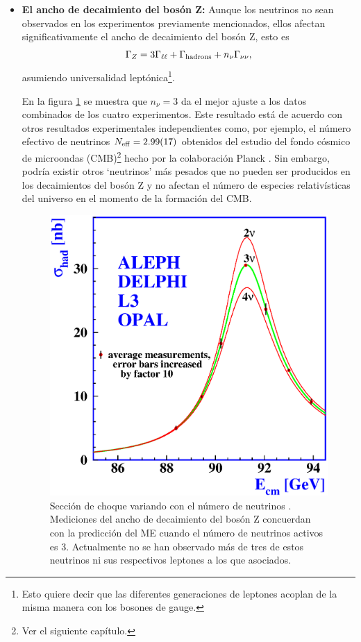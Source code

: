 \begin{itemize}
\newpage	
	\item \textbf{El ancho de decaimiento del bosón Z:} Aunque los neutrinos no sean observados en los experimentos previamente mencionados, ellos afectan significativamente el ancho de decaimiento del bosón Z, esto es \cite{thomson2013modern}
	\begin{equation}
	\Gamma_Z = 3\Gamma_{\ell \ell} + \Gamma_{\rm hadrons} + n_\nu\Gamma_{\nu\nu},
	\end{equation}	  
	asumiendo universalidad leptónica\footnote{Esto quiere decir que las diferentes generaciones de leptones acoplan de la misma manera con los bosones de gauge.}. 
	
En la figura \ref{SMt2} se muestra que $n_\nu =3$ da el mejor ajuste a los datos combinados de los cuatro experimentos. Este resultado está de acuerdo con otros resultados experimentales independientes como, por ejemplo, el número efectivo de neutrinos $N_{\rm eff}=2.99(17)$ obtenidos del estudio del fondo cósmico de microondas (CMB)\footnote{Ver el siguiente capítulo.} hecho por la colaboración Planck \cite{aghanim2020planck}. Sin embargo, podría existir otros `neutrinos' más pesados que no pueden ser producidos en los decaimientos del bosón Z y no afectan el número de especies relativísticas del universo en el momento de la formación del CMB.
	
\begin{figure}[h!]
\centering
\includegraphics[scale=0.55]{Images/SM-test-2.eps}
  \caption[Sección de choque variando con el número de neutrinos]{Sección de choque variando con el número de neutrinos \cite{aleph2005precision}. Mediciones del ancho de decaimiento del bosón Z concuerdan con la predicción del ME cuando el número de neutrinos activos es 3. Actualmente no se han observado más de tres de estos neutrinos ni sus respectivos leptones a los que asociados.}
  \label{SMt2}
\end{figure}
	

\end{itemize}
